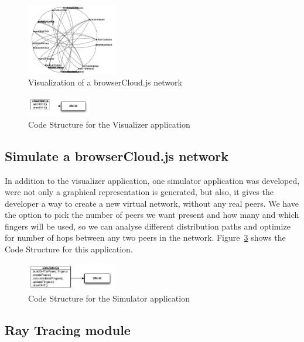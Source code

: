 \begin{figure}[h!]
  \centering
  \includegraphics[width=0.35\textwidth]{figs/visualizer}
  \caption{Visualization of a browserCloud.js network}
  \label{fig:visualizer}
\end{figure}

\begin{figure}[h!]
  \centering
  \includegraphics[width=0.25\textwidth]{figs/diagram-visualizer}
  \caption{Code Structure for the Visualizer application}
  \label{fig:d-v}
\end{figure}

\subsection{Simulate a browserCloud.js network}

In addition to the visualizer application, one simulator application was developed, were not only a graphical representation is generated, but also, it gives the developer a way to create a new virtual network, without any real peers. We have the option to pick the number of peers we want present and how many and which fingers will be used, so we can analyse different distribution paths and optimize for number of hops between any two peers in the network. Figure~\ref{fig:d-s} shows the Code Structure for this application.


\begin{figure}[h!]
  \centering
  \includegraphics[width=0.35\textwidth]{figs/diagram-simulator}
  \caption{Code Structure for the Simulator application}
  \label{fig:d-s}
\end{figure}

\subsection{Ray Tracing module}

